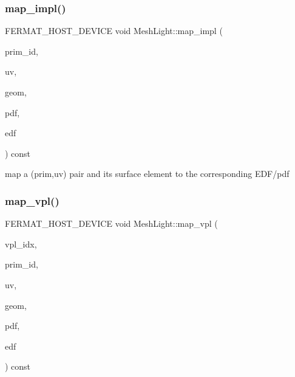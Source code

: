 \subsubsection{\texorpdfstring{map\+\_\+impl()}{map\_impl()}\hspace{0.1cm}{\footnotesize\ttfamily [2/2]}}
{\footnotesize\ttfamily F\+E\+R\+M\+A\+T\+\_\+\+H\+O\+S\+T\+\_\+\+D\+E\+V\+I\+CE void Mesh\+Light\+::map\+\_\+impl (\begin{DoxyParamCaption}\item[{const uint32\+\_\+t}]{prim\+\_\+id,  }\item[{const \hyperlink{structcugar_1_1_vector}{cugar\+::\+Vector2f} \&}]{uv,  }\item[{const \hyperlink{struct_vertex_geometry}{Vertex\+Geometry} \&}]{geom,  }\item[{float $\ast$}]{pdf,  }\item[{\hyperlink{struct_edf}{Edf} $\ast$}]{edf }\end{DoxyParamCaption}) const\hspace{0.3cm}{\ttfamily [inline]}}

map a (prim,uv) pair and its surface element to the corresponding E\+D\+F/pdf \mbox{\label{struct_mesh_light_a2282bb91c6d716231dbf81701fd6c05c}} 
\subsubsection{\texorpdfstring{map\+\_\+vpl()}{map\_vpl()}}
{\footnotesize\ttfamily F\+E\+R\+M\+A\+T\+\_\+\+H\+O\+S\+T\+\_\+\+D\+E\+V\+I\+CE void Mesh\+Light\+::map\+\_\+vpl (\begin{DoxyParamCaption}\item[{const uint32}]{vpl\+\_\+idx,  }\item[{uint32\+\_\+t $\ast$}]{prim\+\_\+id,  }\item[{\hyperlink{structcugar_1_1_vector}{cugar\+::\+Vector2f} $\ast$}]{uv,  }\item[{\hyperlink{struct_vertex_geometry}{Vertex\+Geometry} $\ast$}]{geom,  }\item[{float $\ast$}]{pdf,  }\item[{\hyperlink{struct_edf}{Edf} $\ast$}]{edf }\end{DoxyParamCaption}) const\hspace{0.3cm}{\ttfamily [inline]}}

